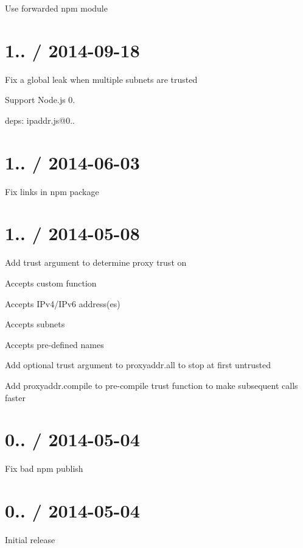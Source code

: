 \begin{DoxyItemize}
\item Use {\ttfamily forwarded} npm module
\end{DoxyItemize}

\section*{1.. / 2014-\/09-\/18 }


\begin{DoxyItemize}
\item Fix a global leak when multiple subnets are trusted
\item Support Node.\+js 0.
\item deps\+: ipaddr.\+js@0..
\end{DoxyItemize}

\section*{1.. / 2014-\/06-\/03 }


\begin{DoxyItemize}
\item Fix links in npm package
\end{DoxyItemize}

\section*{1.. / 2014-\/05-\/08 }


\begin{DoxyItemize}
\item Add {\ttfamily trust} argument to determine proxy trust on
\begin{DoxyItemize}
\item Accepts custom function
\item Accepts I\+Pv4/\+I\+Pv6 address(es)
\item Accepts subnets
\item Accepts pre-\/defined names
\end{DoxyItemize}
\item Add optional {\ttfamily trust} argument to {\ttfamily proxyaddr.\+all} to stop at first untrusted
\item Add {\ttfamily proxyaddr.\+compile} to pre-\/compile {\ttfamily trust} function to make subsequent calls faster
\end{DoxyItemize}

\section*{0.. / 2014-\/05-\/04 }


\begin{DoxyItemize}
\item Fix bad npm publish
\end{DoxyItemize}

\section*{0.. / 2014-\/05-\/04 }


\begin{DoxyItemize}
\item Initial release 
\end{DoxyItemize}